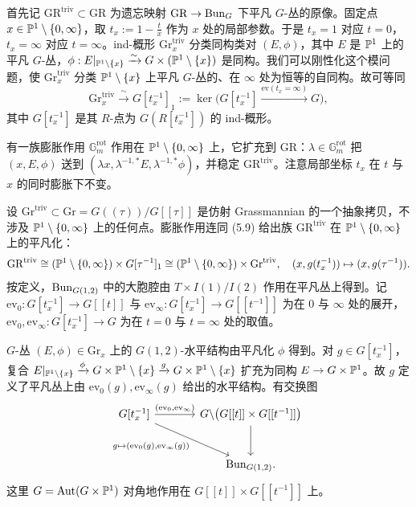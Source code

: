 首先记 $\mathrm{GR}^{\mathrm{triv}}\subset\mathrm{GR}$ 为遗忘映射 $\mathrm{GR}\to\mathrm{Bun}_G$ 下平凡 $G$-丛的原像。固定点 $x\in\mathbb{P}^1\setminus\{0,\infty\}$，取 $t_x:=1-\tfrac tx$ 作为 $x$ 处的局部参数。于是 $t_x=1$ 对应 $t=0$，$t_x=\infty$ 对应 $t=\infty$。ind-概形 $\mathrm{Gr}^{\mathrm{triv}}_x$ 分类同构类对 $(E,\phi)$，其中 $E$ 是 $\mathbb{P}^1$ 上的平凡 $G$-丛，$\phi:E|_{\mathbb{P}^1\setminus\{x\}}\xrightarrow{\sim}G\times(\mathbb{P}^1\setminus\{x\})$ 是同构。我们可以刚性化这个模问题，使 $\mathrm{Gr}^{\mathrm{triv}}_x$ 分类 $\mathbb{P}^1\setminus\{x\}$ 上平凡 $G$-丛的、在 $\infty$ 处为恒等的自同构。故可等同
\begin{equation}
\mathrm{Gr}^{\mathrm{triv}}_x\xrightarrow{\ \sim\ }G[t_x^{-1}]_1:=\ker\big(G[t_x^{-1}]\xrightarrow{\mathrm{ev}(t_x=\infty)}G\big),
\end{equation}
其中 $G[t_x^{-1}]$ 是其 $R$-点为 $G(R[t_x^{-1}])$ 的 ind-概形。

\begin{remark}
有一族膨胀作用 $\mathbb{G}_m^{\mathrm{rot}}$ 作用在 $\mathbb{P}^1\setminus\{0,\infty\}$ 上，它扩充到 $\mathrm{GR}$：$\lambda\in\mathbb{G}_m^{\mathrm{rot}}$ 把 $(x,E,\phi)$ 送到 $(\lambda x,\lambda^{-1,*}E,\lambda^{-1,*}\phi)$，并稳定 $\mathrm{GR}^{\mathrm{triv}}$。注意局部坐标 $t_x$ 在 $t$ 与 $x$ 的同时膨胀下不变。
\end{remark}

设 $\mathrm{Gr}^{\mathrm{triv}}\subset\mathrm{Gr}=G((\tau))/G[[\tau]]$ 是仿射 Grassmannian 的一个抽象拷贝，不涉及 $\mathbb{P}^1\setminus\{0,\infty\}$ 上的任何点。膨胀作用连同 (5.9) 给出族 $\mathrm{GR}^{\mathrm{triv}}$ 在 $\mathbb{P}^1\setminus\{0,\infty\}$ 上的平凡化：
\begin{equation}
\mathrm{GR}^{\mathrm{triv}}\cong(\mathbb{P}^1\setminus\{0,\infty\})\times G[\tau^{-1}]_1\cong(\mathbb{P}^1\setminus\{0,\infty\})\times\mathrm{Gr}^{\mathrm{triv}},\quad
(x,g(t_x^{-1}))\mapsto(x,g(\tau^{-1})).
\end{equation}
按定义，$\mathrm{Bun}_{G(1,2)}$ 中的大胞腔由 $T\times I(1)/I(2)$ 作用在平凡丛上得到。记 $\mathrm{ev}_0:G[t_x^{-1}]\to G[[t]]$ 与 $\mathrm{ev}_\infty:G[t_x^{-1}]\to G[[t^{-1}]]$ 为在 $0$ 与 $\infty$ 处的展开，$\mathrm{ev}_0,\mathrm{ev}_\infty:G[t_x^{-1}]\to G$ 为在 $t=0$ 与 $t=\infty$ 处的取值。

$G$-丛 $(E,\phi)\in\mathrm{Gr}_x$ 上的 $G(1,2)$-水平结构由平凡化 $\phi$ 得到。对 $g\in G[t_x^{-1}]$，复合 $E|_{\mathbb{P}^1\setminus\{x\}}\xrightarrow{\phi}G\times\mathbb{P}^1\setminus\{x\}\xrightarrow{g}G\times\mathbb{P}^1\setminus\{x\}$ 扩充为同构 $E\to G\times\mathbb{P}^1$。故 $g$ 定义了平凡丛上由 $\mathrm{ev}_0(g),\mathrm{ev}_\infty(g)$ 给出的水平结构。有交换图
\[
\begin{tikzcd}[column sep=large, row sep=large]
G[t_x^{-1}] \arrow[r, "{(\mathrm{ev}_0,\mathrm{ev}_\infty)}"] \arrow[dr, "{g\mapsto(\mathrm{ev}_0(g),\mathrm{ev}_\infty(g))}"'] & G\backslash\big(G[[t]]\times G[[t^{-1}]]\big) \arrow[d] \\
& \Bun_{G(1,2)}.
\end{tikzcd}
\]
这里 $G=\operatorname{Aut}(G\times\mathbb{P}^1)$ 对角地作用在 $G[[t]]\times G[[t^{-1}]]$ 上。

